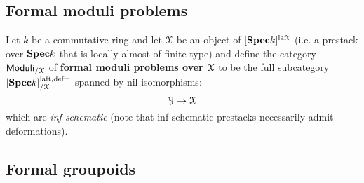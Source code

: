         \subsection{Formal moduli problems}
            \begin{definition} \label{def: formal_moduli_problems}
                Let $k$ be a commutative ring and let $\mathcal{X}$ be an object of $[\mathbf{Spec} k]^{\mathrm{laft}}$ (i.e. a prestack over $\mathbf{Spec} k$ that is locally almost of finite type) and define the category $\mathsf{Moduli}_{/\mathcal{X}}$ of \textbf{formal moduli problems over $\mathcal{X}$} to be the full subcategory $[\mathbf{Spec} k]^{\mathrm{laft}, \mathrm{defm}}_{/\mathcal{X}}$ spanned by nil-isomorphisms:
                    $$\mathcal{Y} \to \mathcal{X}$$
                which are \textit{inf-schematic} (note that inf-schematic prestacks necessarily admit deformations).
            \end{definition}
        
        \subsection{Formal groupoids}